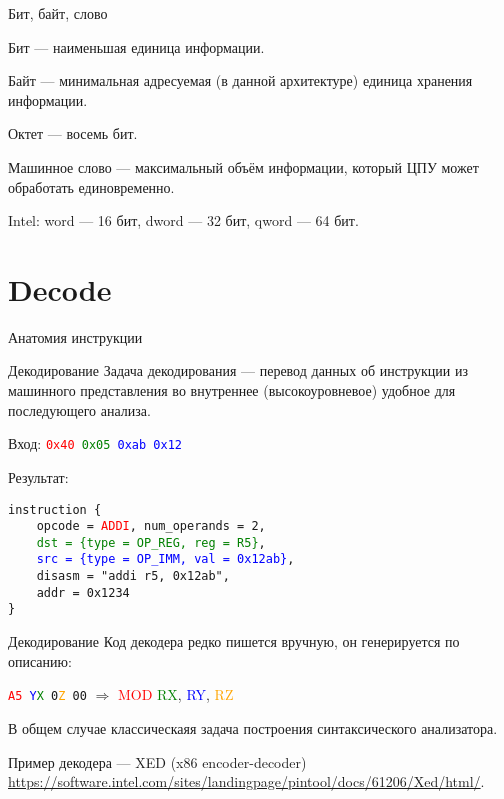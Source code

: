 \begin{frame}{Бит, байт, слово}

Бит \pause --- наименьшая единица информации.

\pause\bigskip

Байт \pause --- минимальная адресуемая (в данной архитектуре) единица хранения
информации.

\pause\bigskip

Октет --- восемь бит.

\pause\bigskip

Машинное слово \pause --- максимальный объём информации, который ЦПУ может
обработать единовременно.

\pause\bigskip

Intel: word — 16 бит, dword — 32 бит, qword — 64 бит.

\end{frame}

\section{Decode}

\begin{frame}{Анатомия инструкции}
\centering
{}
\end{frame}

\begin{frame}{Декодирование}
Задача декодирования --- перевод данных об инструкции из машинного представления
во внутреннее (высокоуровневое) удобное для последующего анализа.

\pause

Вход: \texttt{\textcolor{red}{0x40} \textcolor{green}{0x05} \textcolor{blue}{0xab 0x12}}

Результат:

\texttt{instruction \{ \\
~~~~opcode = \textcolor{red}{ADDI}, num\_operands = 2, \\
~~~~\textcolor{green}{dst = \{type = OP\_REG, reg = R5\}}, \\
~~~~\textcolor{blue}{src = \{type = OP\_IMM, val = 0x12ab\}}, \\
~~~~disasm = "addi r5, 0x12ab", \\
~~~~addr = 0x1234 \\
\}}
\end{frame}

\begin{frame}{Декодирование}
Код декодера редко пишется вручную, он генерируется по описанию:

\texttt{\textcolor{red}{A5} \textcolor{blue}{Y}\textcolor{green}{X} 0\textcolor{orange}{Z} 00} $\Rightarrow$ \textcolor{red}{MOD} \textcolor{green}{RX}, \textcolor{blue}{RY}, \textcolor{orange}{RZ}

\pause\bigskip

В общем случае классическаяя задача построения  синтаксического анализатора.

\pause\bigskip

Пример декодера --- XED (x86 encoder-decoder) \url{https://software.intel.com/sites/landingpage/pintool/docs/61206/Xed/html/}.
\end{frame}

